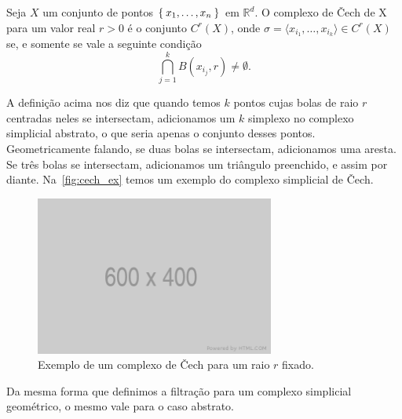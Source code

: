 \begin{defi}
  Seja $X$ um conjunto de pontos $\Set{x_1, \dots, x_n}$ em $\mathbb{R}^d$. O complexo
  de \v{C}ech de X para um valor real $r>0$ é o conjunto $C^r(X)$, onde
  $\sigma = \langle x_{i_1}, \dots, x_{i_k} \rangle \in C^r(X)$ se, e somente se vale a seguinte
  condição
  \begin{equation*}
    \bigcap_{j=1}^k B(x_{i_j},r) \neq \emptyset.
  \end{equation*}
\end{defi}
A definição acima nos diz que quando temos $k$ pontos cujas bolas de raio $r$
centradas neles se intersectam, adicionamos um $k$ simplexo no complexo simplicial
abstrato, o que seria apenas o conjunto desses pontos. Geometricamente falando,
se duas bolas se intersectam, adicionamos uma aresta. Se três bolas se intersectam,
adicionamos um triângulo preenchido, e assim por diante. Na~\autoref{fig:cech_ex}
temos um exemplo do complexo simplicial de \v{C}ech.
\begin{figure}[htb]
  \centering
  \includegraphics[width=0.7\textwidth]{images/placeholder.png}
  \caption{Exemplo de um complexo de \v{C}ech para um raio $r$ fixado.}
  \label{fig:cech_ex}
\end{figure}

Da mesma forma que definimos a filtração para um complexo simplicial geométrico,
o mesmo vale para o caso abstrato.

